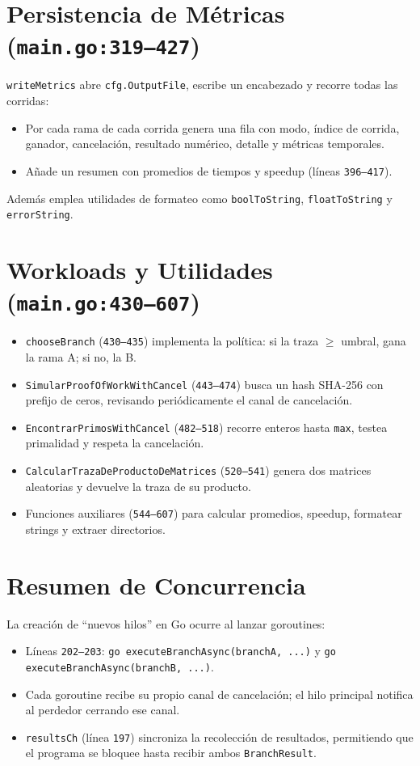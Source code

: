 \documentclass[11pt]{article}
\begin{document}
\section{Persistencia de Métricas (\texttt{main.go:319--427})}
\texttt{writeMetrics} abre \texttt{cfg.OutputFile}, escribe un encabezado y recorre todas las corridas:
\begin{itemize}
  \item Por cada rama de cada corrida genera una fila con modo, índice de corrida, ganador, cancelación, resultado numérico, detalle y métricas temporales.
  \item Añade un resumen con promedios de tiempos y speedup (líneas \texttt{396--417}).
\end{itemize}
Además emplea utilidades de formateo como \texttt{boolToString}, \texttt{floatToString} y \texttt{errorString}.

\section{Workloads y Utilidades (\texttt{main.go:430--607})}
\begin{itemize}
  \item \texttt{chooseBranch} (\texttt{430--435}) implementa la política: si la traza $\ge$ umbral, gana la rama A; si no, la B.
  \item \texttt{SimularProofOfWorkWithCancel} (\texttt{443--474}) busca un hash SHA-256 con prefijo de ceros, revisando periódicamente el canal de cancelación.
  \item \texttt{EncontrarPrimosWithCancel} (\texttt{482--518}) recorre enteros hasta \texttt{max}, testea primalidad y respeta la cancelación.
  \item \texttt{CalcularTrazaDeProductoDeMatrices} (\texttt{520--541}) genera dos matrices aleatorias y devuelve la traza de su producto.
  \item Funciones auxiliares (\texttt{544--607}) para calcular promedios, speedup, formatear strings y extraer directorios.
\end{itemize}

\section{Resumen de Concurrencia}
La creación de “nuevos hilos” en Go ocurre al lanzar goroutines:
\begin{itemize}
  \item Líneas \texttt{202--203}: \texttt{go executeBranchAsync(branchA, ...)} y \texttt{go executeBranchAsync(branchB, ...)}.
  \item Cada goroutine recibe su propio canal de cancelación; el hilo principal notifica al perdedor cerrando ese canal.
  \item \texttt{resultsCh} (línea \texttt{197}) sincroniza la recolección de resultados, permitiendo que el programa se bloquee hasta recibir ambos \texttt{BranchResult}.
\end{itemize}
\end{document}
